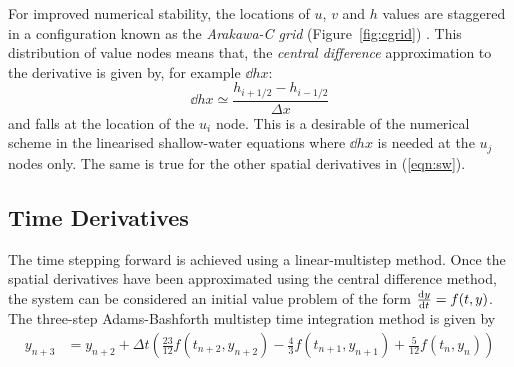 \documentclass[a4paper, sfsidenotes, twoside]{tufte-handout}
\begin{document}
  \noindent For improved numerical stability, the locations of $u$, $v$ and $h$ values are staggered in a configuration known as the \emph{Arakawa-C grid} (Figure~\ref{fig:cgrid}) \cite{Arakawa:1981bx}.
  This distribution of value nodes means that, the \emph{central difference} approximation to the derivative is given by, for example $\dd{h}{x}$:
  \begin{equation}
    \dd{h}{x} \simeq \frac{h_{i+1/2} - h_{i-1/2}}{\Delta x}
  \end{equation}
  and falls at the location of the $u_i$ node.
  This is a desirable of the numerical scheme in the linearised shallow-water equations where $\dd{h}{x}$ is needed at the $u_j$ nodes only.  The same is true for the  other spatial derivatives in (\ref{eqn:sw}).

  \subsection{Time Derivatives}
  \label{sub:timederiv}
  The time stepping forward is achieved using a linear-multistep method.
  Once the spatial derivatives have been approximated using the central difference method, the system can be considered an initial value problem of the form $ \frac{\operatorname{d}\!{} y}{\operatorname{d}\!{t}} = f(t, y) $.
  The three-step Adams-Bashforth multistep time integration method is given by \cite{Parker:2012ii}
  \begin{align}
    y_{n+3} &= y_{n+2} + \Delta t \left( \frac{23}{12} f(t_{n+2}, y_{n+2}) - \frac{4}{3} f(t_{n+1}, y_{n+1}) + \frac{5}{12}f(t_n, y_n)\right) \\
  \end{align}

\pagebreak


\end{document}
